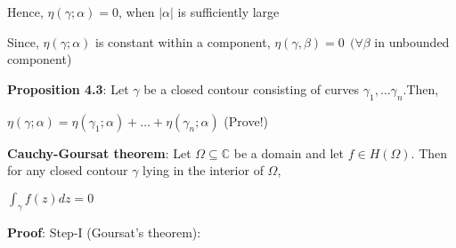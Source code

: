 \documentclass{article}
\begin{document}
\begin{flushleft}
Hence, $\eta(\gamma;\alpha)=0$, when $|\alpha|$ is sufficiently large 

Since, $\eta(\gamma;\alpha)$ is constant within a component, $\eta(\gamma,\beta)=0 \:\:(\forall \beta$ in unbounded component)

\textbf{Proposition 4.3}: Let $\gamma$ be a closed contour consisting of curves $\gamma_1,\dots \gamma_n$.Then,

$\eta(\gamma;\alpha)=\eta(\gamma_1;\alpha)+\dots +\eta(\gamma_n;\alpha)$ (Prove!)

\textbf{Cauchy-Goursat theorem}: Let $\Omega\subseteq \mathds{C}$ be a domain and let $f\in H(\Omega)$. Then for any closed contour $\gamma$ lying in the interior of $\Omega$,

$\int_{\gamma}^{} f(z) dz=0$

\textbf{Proof}: Step-I (Goursat's theorem): 


\end{flushleft}
\end{document}
